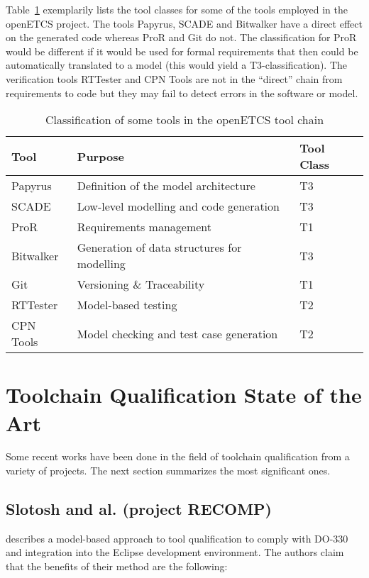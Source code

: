 Table~\ref{tab:oetcs_tool_classification} exemplarily lists the tool classes for some of the tools employed in the openETCS project. The tools Papyrus, SCADE and Bitwalker have a direct effect on the generated code whereas ProR and Git do not. The classification for ProR would be different if it would be used for formal requirements that then could be automatically translated to a model (this would yield a T3-classification). The verification tools RTTester and CPN Tools are not in the ``direct'' chain from requirements to code but they may fail to detect errors in the software or model.

\begin{table}
\begin{center}
\begin{tabular}{lll}
Tool&Purpose&Tool Class\\\hline
Papyrus&Definition of the model architecture&T3\\
SCADE&Low-level modelling and code generation&T3\\
ProR&Requirements management&T1\\
Bitwalker&Generation of data structures for modelling&T3\\
Git&Versioning \& Traceability&T1\\
RTTester&Model-based testing&T2\\
CPN Tools&Model checking and test case generation&T2\\
\end{tabular}
\end{center}
\caption{Classification of some tools in the openETCS tool chain}
\label{tab:oetcs_tool_classification}
\end{table}
 
\section{Toolchain Qualification State of the Art}
\label{sec-1-2}
Some recent works have been done in the field of toolchain
qualification from a variety of projects. The next section summarizes
the most significant ones.

\subsection{Slotosh and al. (project RECOMP)}
\label{sec-1-2.1}

 \cite{slotosch_model-based_2012} describes a model-based approach to tool
 qualification to comply with DO-330 and integration into the Eclipse
 development environment. The authors claim that the benefits of their
 method  are the following:

